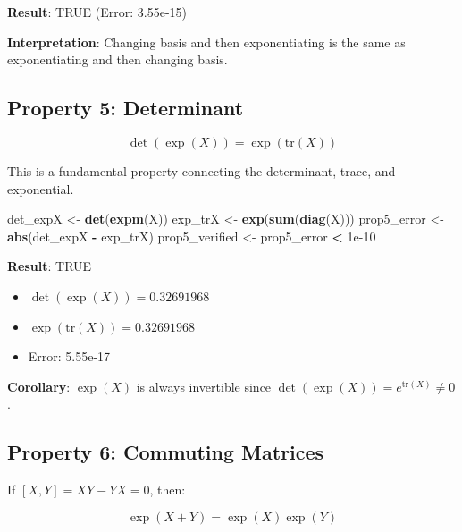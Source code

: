 \documentclass[
]{book}
\newenvironment{Shaded}{\begin{snugshade}}{\end{snugshade}}
\newcommand{\FloatTok}[1]{\textcolor[rgb]{0.00,0.00,0.81}{#1}}
\newcommand{\FunctionTok}[1]{\textcolor[rgb]{0.13,0.29,0.53}{\textbf{#1}}}
\newcommand{\NormalTok}[1]{#1}
\newcommand{\OtherTok}[1]{\textcolor[rgb]{0.56,0.35,0.01}{#1}}
\newcommand{\SpecialCharTok}[1]{\textcolor[rgb]{0.81,0.36,0.00}{\textbf{#1}}}
\providecommand{\tightlist}{%
  \setlength{\itemsep}{0pt}\setlength{\parskip}{0pt}}
\theoremstyle{definition}
\theoremstyle{definition}
\theoremstyle{definition}
\theoremstyle{definition}
\theoremstyle{remark}
\begin{document}
\textbf{Result}: TRUE (Error: 3.55e-15)

\textbf{Interpretation}: Changing basis and then exponentiating is the same as exponentiating and then changing basis.

\subsection{Property 5: Determinant}\label{property-5-determinant}

\[\det(\exp(X)) = \exp(\text{tr}(X))\]

This is a fundamental property connecting the determinant, trace, and exponential.

\begin{Shaded}
\begin{Highlighting}[]
\NormalTok{det\_expX }\OtherTok{\textless{}{-}} \FunctionTok{det}\NormalTok{(}\FunctionTok{expm}\NormalTok{(X))}
\NormalTok{exp\_trX }\OtherTok{\textless{}{-}} \FunctionTok{exp}\NormalTok{(}\FunctionTok{sum}\NormalTok{(}\FunctionTok{diag}\NormalTok{(X)))}
\NormalTok{prop5\_error }\OtherTok{\textless{}{-}} \FunctionTok{abs}\NormalTok{(det\_expX }\SpecialCharTok{{-}}\NormalTok{ exp\_trX)}
\NormalTok{prop5\_verified }\OtherTok{\textless{}{-}}\NormalTok{ prop5\_error }\SpecialCharTok{\textless{}} \FloatTok{1e{-}10}
\end{Highlighting}
\end{Shaded}

\textbf{Result}: TRUE

\begin{itemize}
\tightlist
\item
  \(\det(\exp(X)) = 0.32691968\)
\item
  \(\exp(\text{tr}(X)) = 0.32691968\)
\item
  Error: 5.55e-17
\end{itemize}

\textbf{Corollary}: \(\exp(X)\) is always invertible since \(\det(\exp(X)) = e^{\text{tr}(X)} \neq 0\).

\subsection{Property 6: Commuting Matrices}\label{property-6-commuting-matrices}

If \([X,Y] = XY - YX = 0\), then:

\[\exp(X+Y) = \exp(X)\exp(Y)\]
\end{document}
